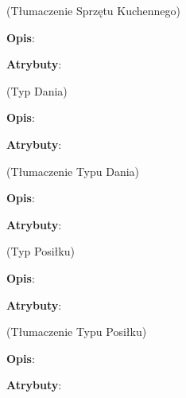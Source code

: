 \begin{enumerate}[label={\textbf{KAT/\protect\threedigits{\theenumi}}}, wide, labelwidth=!, labelindent=0pt, labelsep=0pt, series=reqs]
     \label{kat:KitchenApplianceTranslation} (Tłumaczenie Sprzętu Kuchennego)

    \textbf{Opis}: \lipsum[1]
    \par
    \textbf{Atrybuty}:
    \begin{itemize}[series=atr, wide, align=left, leftmargin=5cm]
         \label{kat:KitchenApplianceTranslation:id}
         \label{kat:KitchenApplianceTranslation:translation}
         \label{kat:KitchenApplianceTranslation:language}
    \end{itemize}

     \label{kat:DishType} (Typ Dania)

    \textbf{Opis}: \lipsum[1]
    \par
    \textbf{Atrybuty}:
    \begin{itemize}[series=atr, wide, align=left, leftmargin=5cm]
         \label{kat:DishType:id}
         \label{kat:DishType:description}
    \end{itemize}

     \label{kat:DishTypeTranslation} (Tłumaczenie Typu Dania)

    \textbf{Opis}: \lipsum[1]
    \par
    \textbf{Atrybuty}:
    \begin{itemize}[series=atr, wide, align=left, leftmargin=5cm]
         \label{kat:DishTypeTranslation:id}
         \label{kat:DishTypeTranslation:translation}
         \label{kat:DishTypeTranslation:language}
    \end{itemize}

     \label{kat:MealType} (Typ Posiłku)

    \textbf{Opis}: \lipsum[1]
    \par
    \textbf{Atrybuty}:
    \begin{itemize}[series=atr, wide, align=left, leftmargin=5cm]
         \label{kat:MealType:id}
         \label{kat:MealType:name}
    \end{itemize}

     \label{kat:MealTypeTranslation} (Tłumaczenie Typu Posiłku)

    \textbf{Opis}: \lipsum[1]
    \par
    \textbf{Atrybuty}:
    \begin{itemize}[series=atr, wide, align=left, leftmargin=5cm]
         \label{kat:MealTypeTranslation:id}
         \label{kat:MealTypeTranslation:translation}
         \label{kat:MealTypeTranslation:language}
    \end{itemize}



\end{enumerate}
